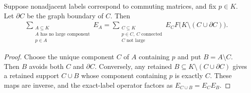 \begin{lemma}
    \label{thm:retained_crossing_component_sum}
    \leanok

    Suppose nonadjacent labels correspond to commuting matrices,
    and fix $p\in K$. Let $\partial C$ be the graph boundary of $C$.
    Then
    \begin{align}
        \sum_{\substack{A\subseteq K\\A\text{ has no large component}\\p\in A}}E_A
        =\sum_{\substack{C\subseteq K\\p\in C,\ C\text{ connected}\\C\text{ not large}}}
            E_C F\bigl(K\setminus(C\cup\partial C)\bigr).
        \label{eq:retained_crossing_component_sum}
    \end{align}
\end{lemma}
\begin{proof}\leanok
    Choose the unique component $C$ of $A$ containing $p$ and put
    $B=A\setminus C$. Then $B$ avoids both $C$ and $\partial C$.
    Conversely, any retained $B\subseteq K\setminus(C\cup\partial C)$
    gives a retained support $C\cup B$ whose component containing $p$
    is exactly $C$. These maps are inverse, and the exact-label
    operator factors as $E_{C\cup B}=E_CE_B$.
\end{proof}

